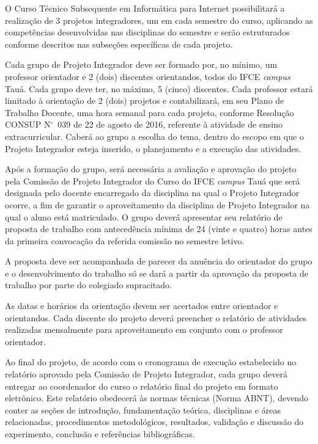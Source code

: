\documentclass[
	12pt,				%
	openright,			%
	twoside,			%
	a4paper,			%
	chapter=TITLE,		%
	english,			%
	french,				%
	spanish,			%
	brazil,				%
	]{abntex2}
\newcommand{\n}{N$^\circ$}
\begin{document}
O Curso Técnico Subsequente em Informática para Internet possibilitará a realização de 3 projetos integradores,  um em cada semestre do curso, aplicando as competências desenvolvidas nas disciplinas do semestre e serão estruturados conforme  descritos  nas subseções específicas de cada projeto.


Cada grupo de Projeto Integrador deve ser formado por, no mínimo, um professor orientador e 2 (dois) discentes orientandos, todos do IFCE \textit{campus} Tauá. Cada grupo deve ter, no máximo, 5 (cinco) discentes. Cada professor estará limitado à orientação de 2 (dois) projetos e contabilizará, em seu Plano de Trabalho Docente, uma hora semanal para cada projeto, conforme Resolução CONSUP \n~039 de 22 de agosto de 2016, referente à atividade de ensino extracurricular. Caberá ao grupo a escolha do tema, dentro do escopo em que o Projeto Integrador esteja inserido, o planejamento e a execução das atividades.

Após a formação do grupo, será necessária a avaliação e aprovação do projeto pela Comissão de Projeto Integrador do Curso do IFCE \textit{campus} Tauá que será designada pelo docente encarregado da disciplina na qual o Projeto Integrador ocorre, a fim de garantir o aproveitamento da disciplina de Projeto Integrador na qual o aluno está matriculado. O grupo deverá apresentar seu relatório de proposta de trabalho com antecedência mínima de 24 (vinte e quatro) horas antes da primeira convocação da referida comissão no semestre letivo. 

A proposta deve ser acompanhada de parecer da anuência do orientador do grupo e o desenvolvimento do trabalho só se dará a partir da aprovação da proposta de trabalho por parte do colegiado supracitado.

As datas e horários da orientação devem ser acertados entre orientador e orientandos. Cada discente do projeto deverá preencher o relatório de atividades realizadas mensalmente para aproveitamento  em conjunto com o professor orientador. 

Ao final do projeto, de acordo com o cronograma de execução estabelecido no relatório aprovado pela  Comissão de Projeto Integrador, cada grupo deverá entregar ao coordenador do curso o relatório final do projeto em formato eletrônico. Este relatório  obedecerá às normas técnicas (Norma ABNT), devendo  conter as seções de introdução, fundamentação teórica, disciplinas e áreas relacionadas, procedimentos metodológicos, resultados, validação e discussão do experimento, conclusão e referências bibliográficas. 
\end{document}
